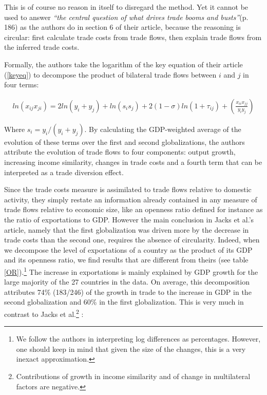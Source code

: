 \documentclass{article}
\begin{document}
This is of course no reason in itself to disregard the method.
Yet it cannot be used to answer \emph{``the central
question of what drives trade booms and busts''}(p. 186) as the
authors do in section 6 of their article, because the reasoning is
circular: first calculate trade costs from trade flows, then
explain trade flows from the inferred trade costs.

Formally, the authors take the logarithm of the key equation of
their article (\ref{keyeq}) to decompose the product of
bilateral trade flows between $i$ and $j$ in four terms:

\begin{eqnarray}
ln (x_{ij}x_{ji})= 2 ln(y_i + y_j)+ ln (s_i s_j) + 2(1-\sigma)ln(1+\tau_{ij})+ \left(\frac{x_{ii} x_{jj}}{y_i y_j}\right)
\end{eqnarray}

Where $s_i=y_i/(y_i+y_j)$. By calculating the GDP-weighted
average of the evolution of these terms over the first and
second globalizations, the authors attribute the evolution of
trade flows to four components: output growth, increasing
income similarity, changes in trade costs and a fourth term
that can be interpreted as a trade diversion effect.

Since the trade costs measure is assimilated to trade flows
relative to domestic activity, they simply restate
 an information already contained in any measure of
trade flows relative to economic size, like an openness ratio
defined for instance as the ratio of exportations to GDP.
However the main conclusion in Jacks et al.'s article, namely
that the first globalization was driven more by the decrease in
trade costs than the second one, requires the absence of circularity.
Indeed, when we decompose the level of
exportations of a country as the product of its GDP and its
openness ratio, we find results that are different from theirs (see table \ref{OR}).\footnote{We follow
the authors in interpreting log differences as percentages. However, one should keep in mind that given the
size of the changes, this is a very inexact approximation.} The increase in exportations is mainly explained by GDP growth for the large majority of the 27 countries in the
data. On average, this decomposition attributes 74\% (183/246) of
the growth in trade to the increase in GDP in the second
globalization and 60\% in the first globalization. This is very much in contrast to 
Jacks et al.\footnote{Contributions of growth in income
similarity and of change in multilateral factors are negative.} :
 
\end{document}
